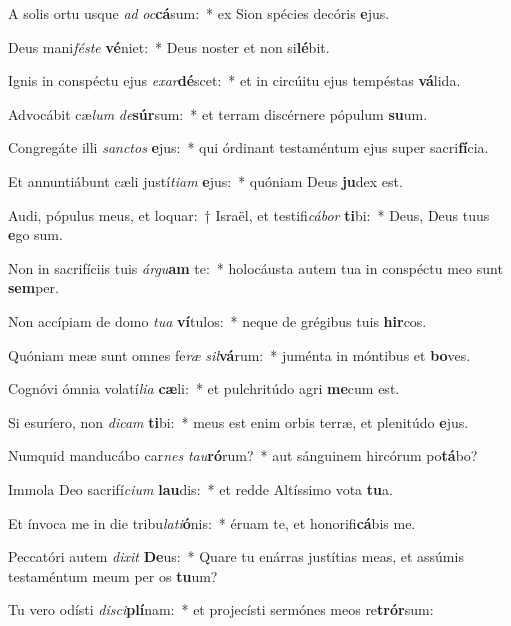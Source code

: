 \item A solis ortu usque \textit{ad} \textit{oc}\textbf{cá}sum:~* ex Sion spécies decóris \textbf{e}jus.
\item Deus mani\textit{fés}\textit{te} \textbf{vé}niet:~* Deus noster et non si\textbf{lé}bit.
\item Ignis in conspéctu ejus \textit{ex}\textit{ar}\textbf{dé}scet:~* et in circúitu ejus tempéstas \textbf{vá}lida.
\item Advocábit cæ\textit{lum} \textit{de}\textbf{súr}sum:~* et terram discérnere pópulum \textbf{su}um.
\item Congregáte illi \textit{sanc}\textit{tos} \textbf{e}jus:~* qui órdinant testaméntum ejus super sacri\textbf{fí}cia.
\item Et annuntiábunt cæli justí\textit{ti}\textit{am} \textbf{e}jus:~* quóniam Deus \textbf{ju}dex est.
\item Audi, pópulus meus, et loquar:~† Israël, et testifi\textit{cá}\textit{bor} \textbf{ti}bi:~* Deus, Deus tuus \textbf{e}go sum.
\item Non in sacrifíciis tuis \textit{ár}\textit{gu}\textbf{am} te:~* holocáusta autem tua in conspéctu meo sunt \textbf{sem}per.
\item Non accípiam de domo \textit{tu}\textit{a} \textbf{ví}tulos:~* neque de grégibus tuis \textbf{hir}cos.
\item Quóniam meæ sunt omnes fe\textit{ræ} \textit{sil}\textbf{vá}rum:~* juménta in móntibus et \textbf{bo}ves.
\item Cognóvi ómnia volatí\textit{li}\textit{a} \textbf{cæ}li:~* et pulchritúdo agri \textbf{me}cum est.
\item Si esuríero, non \textit{di}\textit{cam} \textbf{ti}bi:~* meus est enim orbis terræ, et plenitúdo \textbf{e}jus.
\item Numquid manducábo car\textit{nes} \textit{tau}\textbf{ró}rum?~* aut sánguinem hircórum po\textbf{tá}bo?
\item Immola Deo sacrifí\textit{ci}\textit{um} \textbf{lau}dis:~* et redde Altíssimo vota \textbf{tu}a.
\item Et ínvoca me in die tribu\textit{la}\textit{ti}\textbf{ó}nis:~* éruam te, et honorifi\textbf{cá}bis me.
\item Peccatóri autem \textit{di}\textit{xit} \textbf{De}us:~* Quare tu enárras justítias meas, et assúmis testaméntum meum per os \textbf{tu}um?
\item Tu vero odísti \textit{di}\textit{sci}\textbf{plí}nam:~* et projecísti sermónes meos re\textbf{trór}sum:
